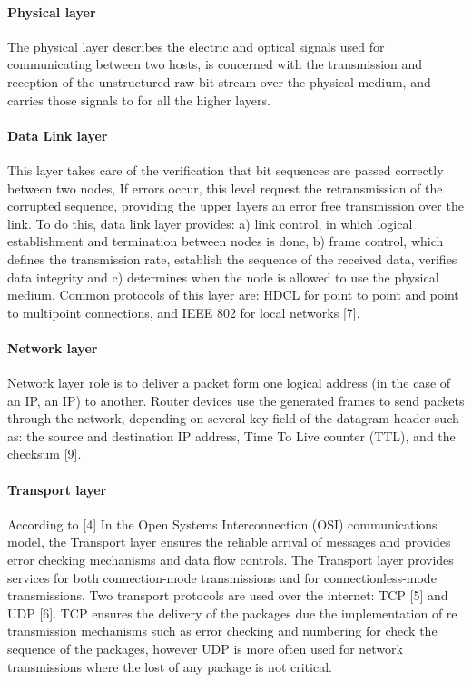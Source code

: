 \documentclass{article}
\begin{document}
\paragraph{Physical layer} %
The physical layer describes the electric and optical signals used for communicating between two hosts, is concerned with the transmission and reception of the unstructured raw bit stream over the physical medium, and carries those signals to for all the higher layers.

\paragraph{Data Link layer} %
This layer takes care of the verification that bit sequences are passed correctly between two nodes, If errors occur, this level request the retransmission of the corrupted sequence, providing the upper layers an error free transmission over the link. To do this, data link layer provides: a) link control, in which logical establishment and termination between nodes is done, b) frame control, which defines the transmission rate, establish the sequence of the received data, verifies data integrity and c) determines when the node is allowed to use the physical medium. Common protocols of this layer are: HDCL for point to point and point to multipoint connections, and IEEE 802 for local networks [7]. 

\paragraph{Network layer} %
Network layer role is to deliver a packet form one logical address (in the case of an IP, an IP) to another. Router devices use the generated frames to send packets through the network, depending on several key field of the datagram header such as: the source and destination IP address, Time To Live counter (TTL), and the checksum [9].

\paragraph{Transport layer} %
According to [4] In the Open Systems Interconnection (OSI) communications model, the Transport layer ensures the reliable arrival of messages and provides error checking mechanisms and data flow controls. The Transport layer provides services for both connection-mode transmissions and for connectionless-mode transmissions. Two transport protocols are used over the internet: TCP [5] and UDP [6]. TCP ensures the delivery of the packages due the implementation of re transmission mechanisms such as error checking and numbering for check the sequence of the packages, however UDP is more often used for network transmissions where the lost of any package is not critical.
\end{document}
